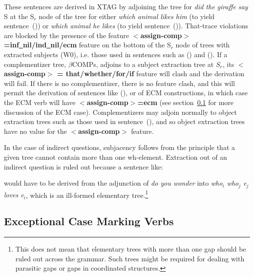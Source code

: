 
These sentences are derived in XTAG by adjoining the tree for {\it did the
giraffe say} S at the S$_r$ node of the tree for either {\it which animal likes
him} (to yield sentence~()) or {\it which animal he likes} (to yield
sentence~()).  That-trace violations are blocked by the presence of the
feature {\bf $<$assign-comp$>$=inf\underline{~}nil/ind\underline{~}nil/ecm}
feature on the bottom of the S$_r$ node of trees with extracted subjects (W0),
i.e. those used in sentences such as () and ().  
If a complementizer tree, $\beta$COMPs, adjoins to a subject
extraction tree at $S_r$, its {\bf $<$assign-comp$>$ =
that/whether/for/if} feature will clash and the derivation will
fail. If there is no complementizer, there is no feature clash, and this will
permit the derivation of sentences like (), or of ECM constructions, in
which case the ECM verb will have {\bf $<$assign-comp$>$=ecm} (see
section~\ref{ecm-verbs} for more discussion of the ECM case).
Complementizers may adjoin normally to object extraction trees such as those
used in sentence~(), and so object extraction trees have no value 
for the {\bf $<$assign-comp$>$} feature.


In the case of indirect questions, subjacency follows from the
principle that a given tree cannot contain more than one
wh-element. Extraction out of an indirect question is ruled out
because a sentence like:


\noindent would have to be derived from the adjunction of {\it do you
wonder} into {\it who$_{i}$ who$_{j}$ e$_{j}$ loves e$_{i}$}, which is an
ill-formed elementary tree.\footnote{This does not mean that elementary trees
with more than one gap should be ruled out across the grammar. Such trees might
be required for dealing with parasitic gaps or gaps in coordinated structures.}

\subsection{Exceptional Case Marking Verbs}
\label{ecm-verbs}

